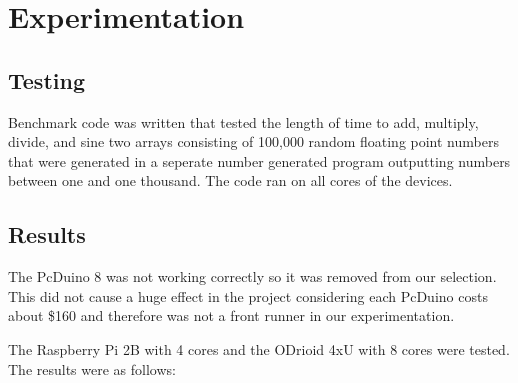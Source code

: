 \documentclass{article}
\begin{document}
\section*{Experimentation}
\subsection*{Testing}
Benchmark code was written that tested the length of time to add, multiply, divide, and sine two arrays consisting of 100,000 random floating point numbers that were generated in a seperate number generated program outputting numbers between one and one thousand. The code ran on all cores of the devices.

\subsection*{Results}
The PcDuino 8 was not working correctly so it was removed from our selection. This did not cause a huge effect in the project considering each PcDuino costs about \$160 and therefore was not a front runner in our experimentation.

The Raspberry Pi 2B with 4 cores and the ODrioid 4xU with 8 cores were tested. The results were as follows:
\end{document}
